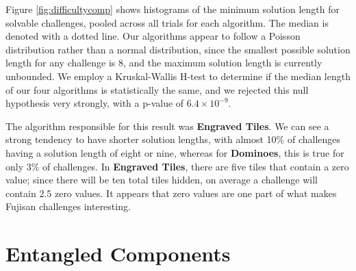 \documentclass[journal]{IEEEtran}
\begin{document}
Figure \ref{fig:difficultycomp} shows histograms of the minimum solution length for solvable challenges, pooled across all trials for each algorithm. The median is denoted with a dotted line. Our algorithms appear to follow a Poisson distribution rather than a normal distribution, since the smallest possible solution length for any challenge is 8, and the maximum solution length is currently unbounded. We employ a Kruskal-Wallis H-test \cite{KRUSKAL} to determine if the median length of our four algorithms is statistically the same, and we rejected this null hypothesis very strongly, with a p-value of $6.4 \times 10^{-9}$.

The algorithm responsible for this result was {\bf Engraved Tiles}. We can see a strong tendency to have shorter solution lengths, with almost 10\% of challenges having a solution length of eight or nine, whereas for {\bf Dominoes}, this is true for only 3\% of challenges. In {\bf Engraved Tiles}, there are five tiles that contain a zero value; since there will be ten total tiles hidden, on average a challenge will contain 2.5 zero values. It appears that zero values are one part of what makes Fujisan challenges interesting.





\section{Entangled Components}



\end{document}
